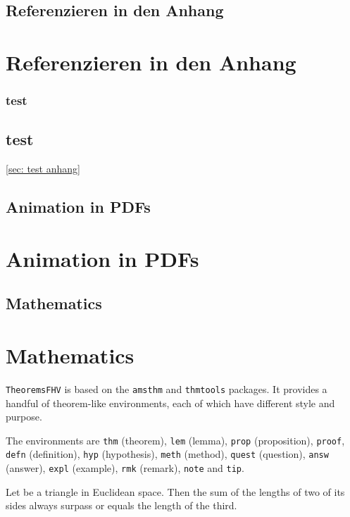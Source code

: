 \documentclass[./\jobname.tex]{subfiles}
\begin{document}
	\section{Referenzieren in den Anhang}
\else
	\chapter{Referenzieren in den Anhang}
\fi
%
\if\paper\FHVmode
	\subsection{test}
\else
	\section{test}
	\autoref{sec: test anhang}
\fi
%
\if\paper\FHVmode
	\section{Animation in PDFs}
\else
	\chapter{Animation in PDFs}
\fi
%
\if\paper\FHVmode
	\section{Mathematics}
\else
	\chapter{Mathematics}
\fi
\texttt{TheoremsFHV} is based on the \texttt{amsthm} and \texttt{thmtools} packages. It provides a handful of theorem-like environments, each of which have different style and purpose.

The environments are \texttt{thm} (theorem), \texttt{lem} (lemma), \texttt{prop} (proposition), \texttt{proof}, \texttt{defn} (definition), \texttt{hyp} (hypothesis), \texttt{meth} (method), \texttt{quest} (question), \texttt{answ} (answer), \texttt{expl} (example), \texttt{rmk} (remark), \texttt{note} and \texttt{tip}.

\begin{thm}
    Let be a triangle in Euclidean space. Then the sum of the lengths of two of its sides always surpass or equals the length of the third.
\end{thm}
\end{document}
